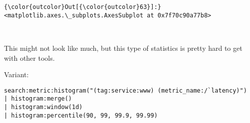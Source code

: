 \documentclass[11pt]{article}
\begin{document}
\begin{Verbatim}[commandchars=\\\{\}]
{\color{outcolor}Out[{\color{outcolor}63}]:} <matplotlib.axes.\_subplots.AxesSubplot at 0x7f70c90a77b8>
\end{Verbatim}
            
    \begin{center}
    \end{center}
    { \hspace*{\fill} \\}
    
    This might not look like much, but this type of statistics is pretty
hard to get with other tools.

Variant:

\begin{verbatim}
search:metric:histogram("(tag:service:www) (metric_name:/`latency)")
| histogram:merge()
| histogram:window(1d)
| histogram:percentile(90, 99, 99.9, 99.99)
\end{verbatim}


    
    
    
    
\end{document}
